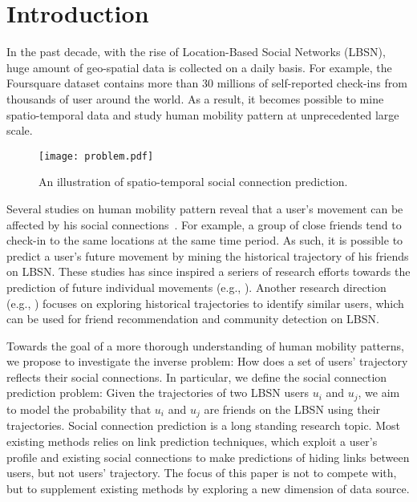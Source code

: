 \section{Introduction}\label{sec:intro}

In the past decade, with the rise of Location-Based Social Networks (LBSN), huge amount of geo-spatial data is collected on a daily basis. For example, the Foursquare\cite{yang2015nationtelescope} dataset contains more than 30 millions of self-reported check-ins from thousands of user around the world. As a result, it becomes possible to mine spatio-temporal data and study human mobility pattern at unprecedented large scale.

\begin{figure}[htbp]
\begin{center}
\texttt{[image: problem.pdf]}
\end{center}
\caption{An illustration of spatio-temporal social connection prediction. }\label{Example1}
\vspace{-2mm}
\end{figure}


Several studies on human mobility pattern reveal that a user's movement can be affected by his social connections~\cite{cho2011friendship, ye2013s}. For example, a group of close friends tend to check-in to the same locations at the same time period. As such, it is possible to predict a user's future movement by mining the historical trajectory of his friends on LBSN. These studies has since inspired a seriers of research efforts towards the prediction of future individual movements (e.g., \cite{noulas2012mining, gao2012mobile, scellato2011nextplace, lian2013collaborative}). Another research direction (e.g., \cite{xiao2010finding}) focuses on exploring historical trajectories to identify similar users, which can be used for friend recommendation and community detection on LBSN. 


Towards the goal of a more thorough understanding of human mobility patterns, we propose to investigate the inverse problem:  How does a set of users' trajectory reflects their social connections. In particular, we define the social connection prediction problem: Given the trajectories of two LBSN users $u_i$ and $u_j$, we aim to model the probability that $u_i$ and $u_j$ are friends on the LBSN using their trajectories. Social connection prediction is a long standing research topic. Most existing methods relies on link prediction techniques, which exploit a user's profile and existing social connections to make predictions of hiding links between users, but not users' trajectory. The focus of this paper is not to compete with, but to supplement existing methods by exploring a new dimension of data source.

